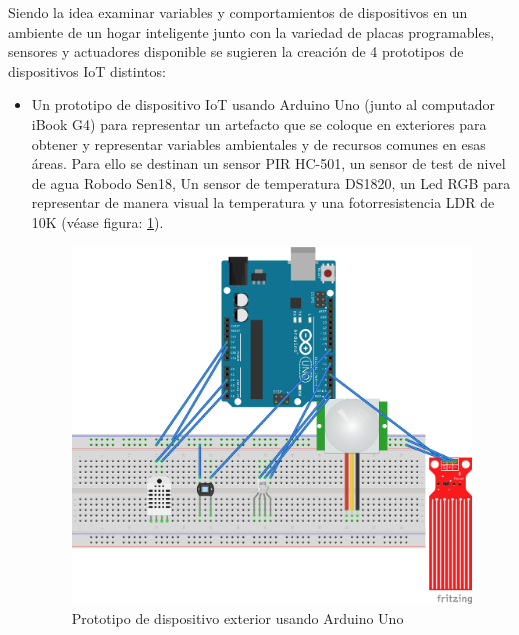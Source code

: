 Siendo la idea examinar variables y comportamientos de dispositivos en un ambiente de un hogar inteligente junto con la variedad de placas programables, sensores y actuadores disponible se sugieren la creación de 4 prototipos de dispositivos IoT distintos:

\begin{itemize}
\item Un prototipo de dispositivo IoT usando Arduino Uno (junto al computador iBook G4) para representar un artefacto que se coloque en exteriores para obtener y representar variables ambientales y de recursos comunes en esas áreas. Para ello se destinan un sensor PIR HC-501, un sensor de test de nivel de agua Robodo Sen18, Un sensor de temperatura DS1820, un Led RGB para representar de manera visual la temperatura y una fotorresistencia LDR de 10K (véase figura: \ref{fig:arduino1}).
\begin{figure}[htb]
\centering
\includegraphics[scale=0.5]{./Figuras/arduino1.png}
\caption{Prototipo de dispositivo exterior usando Arduino Uno}
\label{fig:arduino1}
\vspace*{-10pt}
\end{figure}


\end{itemize}

